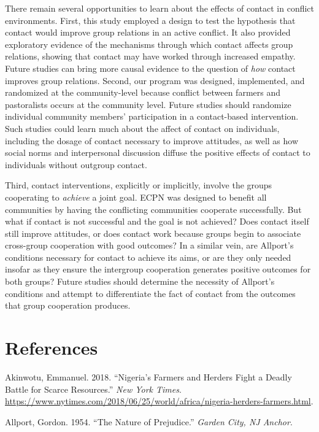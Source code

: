 \documentclass[11pt]{article}
\begin{document}
There remain several opportunities to learn about the effects of contact
in conflict environments. First, this study employed a design to test
the hypothesis that contact would improve group relations in an active
conflict. It also provided exploratory evidence of the mechanisms
through which contact affects group relations, showing that contact may
have worked through increased empathy. Future studies can bring more
causal evidence to the question of \emph{how} contact improves group
relations. Second, our program was designed, implemented, and randomized
at the community-level because conflict between farmers and pastoralists
occurs at the community level. Future studies should randomize
individual community members' participation in a contact-based
intervention. Such studies could learn much about the affect of contact
on individuals, including the dosage of contact necessary to improve
attitudes, as well as how social norms and interpersonal discussion
diffuse the positive effects of contact to individuals without outgroup
contact.

Third, contact interventions, explicitly or implicitly, involve the
groups cooperating to \emph{achieve} a joint goal. ECPN was designed to
benefit all communities by having the conflicting communities cooperate
successfully. But what if contact is not successful and the goal is not
achieved? Does contact itself still improve attitudes, or does contact
work because groups begin to associate cross-group cooperation with good
outcomes? In a similar vein, are Allport's conditions necessary for
contact to achieve its aims, or are they only needed insofar as they
ensure the intergroup cooperation generates positive outcomes for both
groups? Future studies should determine the necessity of Allport's
conditions and attempt to differentiate the fact of contact from the
outcomes that group cooperation produces.

\hypertarget{references}{%
\section*{References}\label{references}}

\hypertarget{refs}{}
\leavevmode\hypertarget{ref-nyt2018nigeria}{}%
Akinwotu, Emmanuel. 2018. ``Nigeria's Farmers and Herders Fight a Deadly
Battle for Scarce Resources.'' \emph{New York Times}.
\url{https://www.nytimes.com/2018/06/25/world/africa/nigeria-herders-farmers.html}.

\leavevmode\hypertarget{ref-allport1954prejudice}{}%
Allport, Gordon. 1954. ``The Nature of Prejudice.'' \emph{Garden City,
NJ Anchor}.
\end{document}
